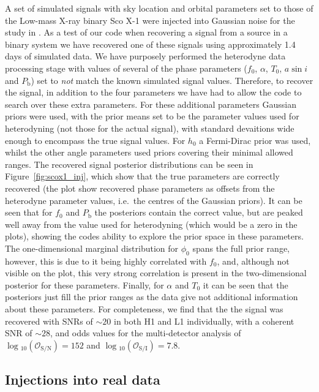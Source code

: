 A set of simulated signals with sky location and orbital parameters set to those of the Low-mass X-ray binary Sco X-1 were injected into
Gaussian noise for the study in \citet{2015PhRvD..92b3006M}. As a test of our code when recovering a signal from a source in a binary system
we have recovered one of these signals using approximately 1.4 days of simulated data. We have purposely performed the heterodyne data processing stage
with values of several of the phase parameters ($f_0$, $\alpha$, $T_0$, $a\sin{i}$ and $P_{\text{b}}$) set to {\it not} match the known simulated signal
values. Therefore, to recover the signal, in addition to the four \gw parameters we have had to allow the code to search over these extra parameters.
For these additional parameters Gaussian priors were used, with the prior means set to be the parameter values used for heterodyning (not those for
the actual signal), with standard devaitions wide enough to encompass the true signal values. For $h_0$ a Fermi-Dirac prior was used, whilst the other
angle parameters used priors covering their minimal allowed ranges. The recovered signal posterior distributions can be seen
in Figure~\ref{fig:scox1_inj}, which show that the true parameters are correctly recovered (the plot show recovered phase parameters as offsets from
the heterodyne parameter values, i.e.\ the centres of the Gaussian priors). It can be seen that for $f_0$ and $P_{\text{b}}$ the posteriors contain the
correct value, but are peaked well away from the value used for heterodyning (which would be a zero in the plots), showing the codes ability to explore
the prior space in these parameters. The one-dimensional marginal distribution for $\phi_0$ spans the full prior range, however, this is due to it being
highly correlated with $f_0$, and, although not visible on the plot, this very strong correlation is present in the two-dimensional posterior for these
parameters. Finally, for $\alpha$ and $T_0$ it can be seen that the posteriors just fill the prior ranges as the data give not additional information
about these parameters. For completeness, we find that the the signal was recovered with SNRs of $\sim 20$ in both H1 and L1 individually, with a coherent
SNR of $\sim 28$, and odds values for the multi-detector analysis of $\log{}_{10}\left(\mathcal{O}_{\text{S}/\text{N}}\right) = 152$
and $\log{}_{10}\left(\mathcal{O}_{\text{S}/\text{I}}\right) = 7.8$.

\subsection{Injections into real data}


